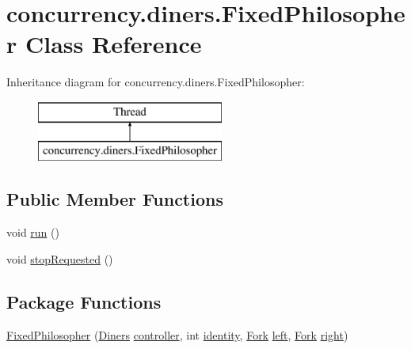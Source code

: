 \hypertarget{classconcurrency_1_1diners_1_1_fixed_philosopher}{}\section{concurrency.\+diners.\+Fixed\+Philosopher Class Reference}
\label{classconcurrency_1_1diners_1_1_fixed_philosopher}
Inheritance diagram for concurrency.\+diners.\+Fixed\+Philosopher\+:\begin{figure}[H]
\begin{center}
\leavevmode
\includegraphics[height=2.000000cm]{classconcurrency_1_1diners_1_1_fixed_philosopher}
\end{center}
\end{figure}
\subsection*{Public Member Functions}
\begin{DoxyCompactItemize}
\item 
void \mbox{\hyperlink{classconcurrency_1_1diners_1_1_fixed_philosopher_ac59ca3a6e64e739ba09100994844121b}{run}} ()
\item 
void \mbox{\hyperlink{classconcurrency_1_1diners_1_1_fixed_philosopher_a72fb3fd5c308a99cfc082e1c66737e22}{stop\+Requested}} ()
\end{DoxyCompactItemize}
\subsection*{Package Functions}
\begin{DoxyCompactItemize}
\item 
\mbox{\hyperlink{classconcurrency_1_1diners_1_1_fixed_philosopher_a48572321c18f10ca554d0caa42adea3e}{Fixed\+Philosopher}} (\mbox{\hyperlink{classconcurrency_1_1diners_1_1_diners}{Diners}} \mbox{\hyperlink{classconcurrency_1_1diners_1_1_fixed_philosopher_a909154a6fbb8a9edde312f68d3198c9d}{controller}}, int \mbox{\hyperlink{classconcurrency_1_1diners_1_1_fixed_philosopher_a13bd397cacaca012e3895178f7a2de94}{identity}}, \mbox{\hyperlink{classconcurrency_1_1diners_1_1_fork}{Fork}} \mbox{\hyperlink{classconcurrency_1_1diners_1_1_fixed_philosopher_a1497025833df648aff2d8ede353aa78e}{left}}, \mbox{\hyperlink{classconcurrency_1_1diners_1_1_fork}{Fork}} \mbox{\hyperlink{classconcurrency_1_1diners_1_1_fixed_philosopher_acb8d793707783eb15a614bd2d8c0abc3}{right}})
\end{DoxyCompactItemize}
